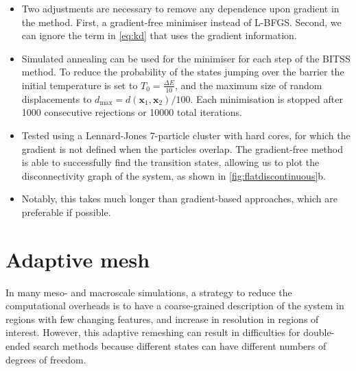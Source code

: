 \documentclass[aps,twocolumn]{revtex4}
\begin{document}
\begin{itemize}
\item
Two adjustments are necessary to remove any dependence upon gradient in the method.
First, a gradient-free minimiser instead of L-BFGS.
Second, we can ignore the term in \cref{eq:kd} that uses the gradient information.
\item
Simulated annealing can be used for the minimiser for each step of the BITSS method.
To reduce the probability of the states jumping over the barrier the initial temperature is set to $T_0 = \frac{\Delta E}{10}$, and the maximum size of random displacements to $d_\text{max} = d(\bm{x}_1, \bm{x}_2) / 100$.
Each minimisation is stopped after 1000 consecutive rejections or 10000 total iterations.
\item
Tested using a Lennard-Jones 7-particle cluster with hard cores, for which the gradient is not defined when the particles overlap.
The gradient-free method is able to successfully find the transition states, allowing us to plot the disconnectivity graph of the system, as shown in \cref{fig:flatdiscontinuous}b.
\item
Notably, this takes much longer than gradient-based approaches, which are preferable if possible.
\end{itemize}


\section{Adaptive mesh}
\topic In many meso- and macroscale simulations, a strategy to reduce the computational overheads is to have a coarse-grained description of the system in regions with few changing features, and increase in resolution in regions of interest.
However, this adaptive remeshing can result in difficulties for double-ended search methods because different states can have different numbers of degrees of freedom.
\end{document}
